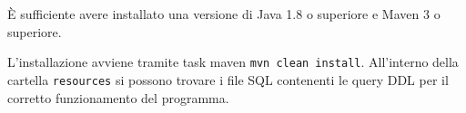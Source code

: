 È sufficiente avere installato una versione di Java 1.8 o superiore e Maven 3 o superiore.

L'installazione avviene tramite task maven \texttt{mvn clean install}.
All'interno della cartella \texttt{resources} si possono trovare i file SQL contenenti le query DDL per il corretto funzionamento del programma.